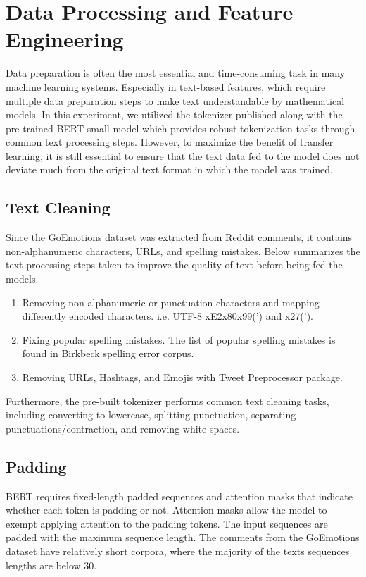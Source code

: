 \documentclass[conference]{IEEEtran}
\begin{document}
\section{Data Processing and Feature Engineering}
Data preparation is often the most essential and time-consuming task in many machine learning systems. Especially in text-based features, which require multiple data preparation steps to make text understandable by mathematical models. In this experiment, we utilized the tokenizer published along with the pre-trained BERT-small model\cite{bhargava2021generalization}\cite{DBLP:journals/corr/abs-1908-08962} which provides robust tokenization tasks through common text processing steps. However, to maximize the benefit of transfer learning, it is still essential to ensure that the text data fed to the model does not deviate much from the original text format in which the model was trained. 

\subsection{Text Cleaning}
Since the GoEmotions dataset was extracted from Reddit comments, it contains non-alphanumeric characters, URLs, and spelling mistakes. Below summarizes the text processing steps taken to improve the quality of text before being fed the models. 

\begin{enumerate}
  \item Removing non-alphanumeric or punctuation characters and mapping differently encoded characters. i.e. UTF-8 xE2x80x99(’) and x27('). 
  \item Fixing popular spelling mistakes. The list of popular spelling mistakes is found in Birkbeck spelling error corpus\cite{20.500.12024/0643}. 
  \item Removing URLs, Hashtags, and Emojis with Tweet Preprocessor package\cite{https://github.com/s/preprocessor}.
\end{enumerate}

Furthermore, the pre-built tokenizer performs common text cleaning tasks, including converting to lowercase, splitting punctuation, separating punctuations/contraction, and removing white spaces. 

\subsection{Padding}
BERT\cite{DBLP:journals/corr/abs-1810-04805} requires fixed-length padded sequences and attention masks that indicate whether each token is padding or not. Attention masks allow the model to exempt applying attention to the padding tokens\cite{DBLP:journals/corr/VaswaniSPUJGKP17}. The input sequences are padded with the maximum sequence length. The comments from the GoEmotions dataset have relatively short corpora, where the majority of the texts sequences lengths are below 30. 
\end{document}
